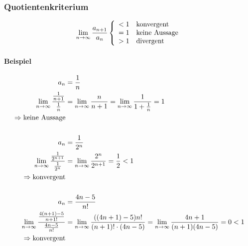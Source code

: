 \subsubsection{Quotientenkriterium}

\[
	\lim_{n \rightarrow{} \infty} \frac{a_{n + 1}}{a_n}
	\left \{
	\begin{array}{l}
		< 1 \quad \text{konvergent}    \\
		= 1 \quad \text{keine Aussage} \\
		> 1 \quad \text{divergent}
	\end{array}
	\right.
\]

\paragraph{Beispiel}

\begin{align*}
	a_n                                                           & = \frac{1}{n}                                                                                                \\
	\lim_{n \rightarrow{} \infty} \frac{\frac{1}{n + 1}}{\frac{1}{n}}            & = \lim_{n \rightarrow{} \infty} \frac{n}{n+1} = \lim_{n \rightarrow{} \infty} \frac{1}{1 + \frac{1}{n}} = 1                                \\
	\Rightarrow \text{keine Aussage}                                                                                                                                             \\
	\\
	a_n                                                           & = \frac{1}{2^n}                                                                                              \\
	\lim_{n \rightarrow{} \infty} \frac{\frac{1}{2^{n+1}}}{\frac{1}{2^n}}        & = \lim_{n \rightarrow{} \infty} \frac{2^n}{2^{n+1}} = \frac{1}{2} < 1                                                       \\
	\Rightarrow \text{konvergent}                                                                                                                                                \\
	\\
	a_n                                                           & = \frac{4n-5}{n!}                                                                                            \\
	\lim_{n \rightarrow{} \infty} \frac{\frac{4(n+1) -5}{n+1!}}{\frac{4n-5}{n!}} & = \lim_{n \rightarrow{} \infty} \frac{((4n+1) -5) n!}{(n+1)!\cdot (4n-5)} = \lim_{n \rightarrow{} \infty} \frac{4n+1}{(n+1)(4n-5)} = 0 < 1 \\
	\Rightarrow \text{konvergent}
\end{align*}
